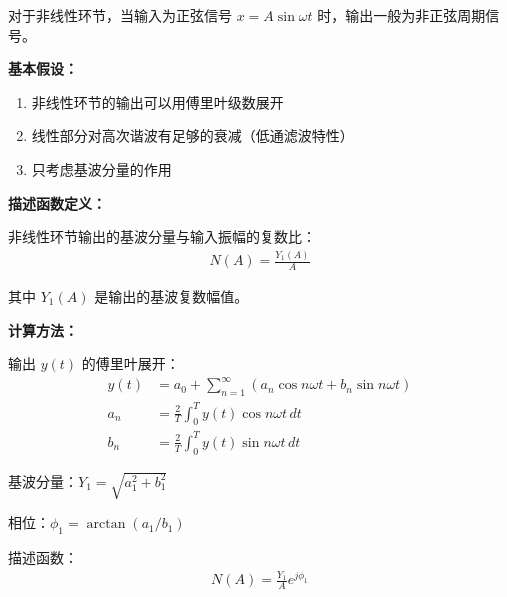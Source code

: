 对于非线性环节，当输入为正弦信号 $x = A\sin\omega t$ 时，输出一般为非正弦周期信号。

\begin{minipage}[t]{0.52\textwidth}
\textbf{基本假设：}

\begin{enumerate}
    \item 非线性环节的输出可以用傅里叶级数展开
    \item 线性部分对高次谐波有足够的衰减（低通滤波特性）
    \item 只考虑基波分量的作用
\end{enumerate}

\textbf{描述函数定义：}

非线性环节输出的基波分量与输入振幅的复数比：
\begin{align*}
N(A) = \frac{Y_1(A)}{A}
\end{align*}

其中 $Y_1(A)$ 是输出的基波复数幅值。

\vspace{0.3cm}
\textbf{计算方法：}

输出 $y(t)$ 的傅里叶展开：
\begin{align*}
y(t) &= a_0 + \sum_{n=1}^{\infty} (a_n\cos n\omega t + b_n\sin n\omega t) \\
a_n &= \frac{2}{T}\int_0^T y(t)\cos n\omega t \, dt \\
b_n &= \frac{2}{T}\int_0^T y(t)\sin n\omega t \, dt
\end{align*}

基波分量：$Y_1 = \sqrt{a_1^2 + b_1^2}$

相位：$\phi_1 = \arctan(a_1/b_1)$

描述函数：
\begin{align*}
N(A) = \frac{Y_1}{A} e^{j\phi_1}
\end{align*}
\end{minipage}\hfill
